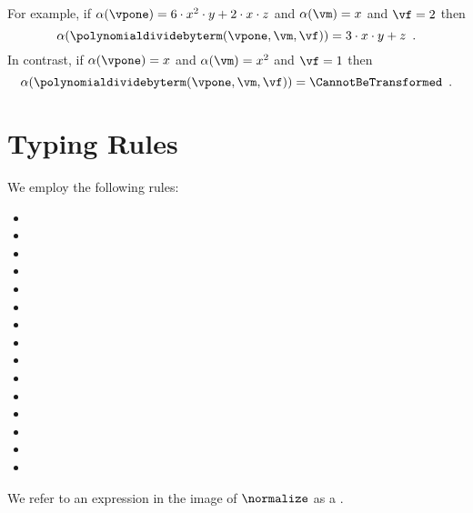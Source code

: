 For example,
if $\alpha(\vpone) = 6\cdot{}x^2\cdot{}y + 2\cdot{}x\cdot{}z$
and $\alpha(\vm) = x$ and $\vf=2$ then
\[
\alpha(\polynomialdividebyterm(\vpone, \vm, \vf)) =  3\cdot{}x\cdot{}y + z \enspace.
\]
%
In contrast, if $\alpha(\vpone) = x$
and $\alpha(\vm) = x^2$ and $\vf=1$ then
\[
\alpha(\polynomialdividebyterm(\vpone, \vm, \vf)) =  \CannotBeTransformed \enspace.
\]

\section{Typing Rules\label{sec:SymbolicReductionAndEquivalenceTestingRules}}
We employ the following rules:
\begin{itemize}
  \item {}
  \item {}
  \item {}
  \item {}
  \item {}
  \item {}
  \item {}
  \item {}
  \item {}
  \item {}
  \item {}
  \item {}
  \item {}
  \item {}
  \item {}
\end{itemize}


\hypertarget{def-normalizedterm}{}
We refer to an expression in the image of $\normalize$ as a \emph{\normalizedexpressionterm}.


